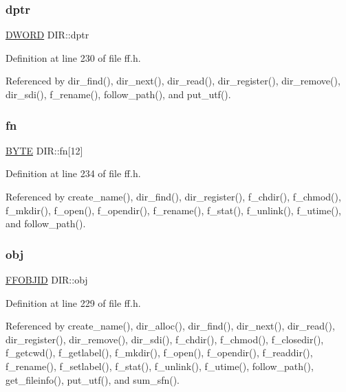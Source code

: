 \mbox{\label{structDIR_a0330e9554e1f38795debe4495156873e}} 
\subsubsection{\texorpdfstring{dptr}{dptr}}
{\footnotesize\ttfamily \hyperlink{ff_8h_ad342ac907eb044443153a22f964bf0af}{D\+W\+O\+RD} D\+I\+R\+::dptr}



Definition at line 230 of file ff.\+h.



Referenced by dir\+\_\+find(), dir\+\_\+next(), dir\+\_\+read(), dir\+\_\+register(), dir\+\_\+remove(), dir\+\_\+sdi(), f\+\_\+rename(), follow\+\_\+path(), and put\+\_\+utf().

\mbox{\label{structDIR_ad90d974c0e7640307598c586bf141b32}} 
\subsubsection{\texorpdfstring{fn}{fn}}
{\footnotesize\ttfamily \hyperlink{ff_8h_a4ae1dab0fb4b072a66584546209e7d58}{B\+Y\+TE} D\+I\+R\+::fn\mbox{[}12\mbox{]}}



Definition at line 234 of file ff.\+h.



Referenced by create\+\_\+name(), dir\+\_\+find(), dir\+\_\+register(), f\+\_\+chdir(), f\+\_\+chmod(), f\+\_\+mkdir(), f\+\_\+open(), f\+\_\+opendir(), f\+\_\+rename(), f\+\_\+stat(), f\+\_\+unlink(), f\+\_\+utime(), and follow\+\_\+path().

\mbox{\label{structDIR_a8fa2dfd8198410ea92a98281d982cf44}} 
\subsubsection{\texorpdfstring{obj}{obj}}
{\footnotesize\ttfamily \hyperlink{structFFOBJID}{F\+F\+O\+B\+J\+ID} D\+I\+R\+::obj}



Definition at line 229 of file ff.\+h.



Referenced by create\+\_\+name(), dir\+\_\+alloc(), dir\+\_\+find(), dir\+\_\+next(), dir\+\_\+read(), dir\+\_\+register(), dir\+\_\+remove(), dir\+\_\+sdi(), f\+\_\+chdir(), f\+\_\+chmod(), f\+\_\+closedir(), f\+\_\+getcwd(), f\+\_\+getlabel(), f\+\_\+mkdir(), f\+\_\+open(), f\+\_\+opendir(), f\+\_\+readdir(), f\+\_\+rename(), f\+\_\+setlabel(), f\+\_\+stat(), f\+\_\+unlink(), f\+\_\+utime(), follow\+\_\+path(), get\+\_\+fileinfo(), put\+\_\+utf(), and sum\+\_\+sfn().

